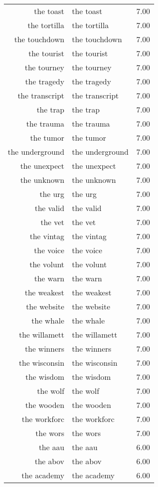 \begin{table}[ht]
\begin{tabular}{rlr}
  the toast & the toast & 7.00 \\ 
  the tortilla & the tortilla & 7.00 \\ 
  the touchdown & the touchdown & 7.00 \\ 
  the tourist & the tourist & 7.00 \\ 
  the tourney & the tourney & 7.00 \\ 
  the tragedy & the tragedy & 7.00 \\ 
  the transcript & the transcript & 7.00 \\ 
  the trap & the trap & 7.00 \\ 
  the trauma & the trauma & 7.00 \\ 
  the tumor & the tumor & 7.00 \\ 
  the underground & the underground & 7.00 \\ 
  the unexpect & the unexpect & 7.00 \\ 
  the unknown & the unknown & 7.00 \\ 
  the urg & the urg & 7.00 \\ 
  the valid & the valid & 7.00 \\ 
  the vet & the vet & 7.00 \\ 
  the vintag & the vintag & 7.00 \\ 
  the voice & the voice & 7.00 \\ 
  the volunt & the volunt & 7.00 \\ 
  the warn & the warn & 7.00 \\ 
  the weakest & the weakest & 7.00 \\ 
  the website & the website & 7.00 \\ 
  the whale & the whale & 7.00 \\ 
  the willamett & the willamett & 7.00 \\ 
  the winners & the winners & 7.00 \\ 
  the wisconsin & the wisconsin & 7.00 \\ 
  the wisdom & the wisdom & 7.00 \\ 
  the wolf & the wolf & 7.00 \\ 
  the wooden & the wooden & 7.00 \\ 
  the workforc & the workforc & 7.00 \\ 
  the wors & the wors & 7.00 \\ 
  the aau & the aau & 6.00 \\ 
  the abov & the abov & 6.00 \\ 
  the academy & the academy & 6.00 \\ 

\end{tabular}
\end{table}
